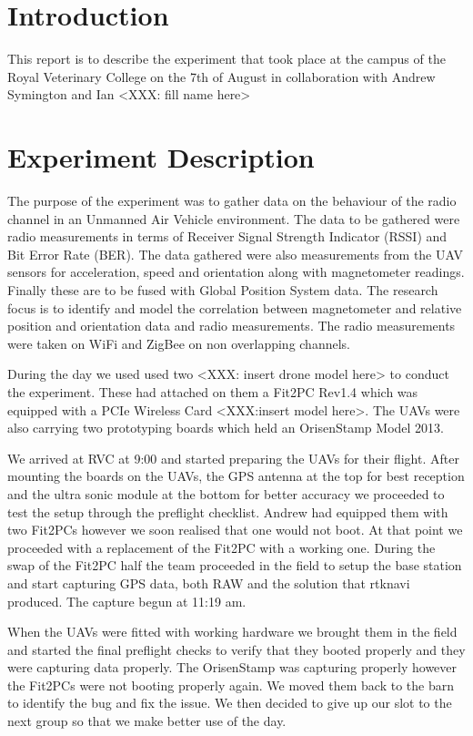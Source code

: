 





\section{Introduction}

This report is to describe the experiment that took place at the campus of the
Royal Veterinary College on the 7th of August in collaboration with Andrew
Symington and Ian <XXX: fill name here>


\section{Experiment Description}
The purpose of the experiment was to gather data on the behaviour of the radio
channel in an Unmanned Air Vehicle environment. The data to be gathered were
radio measurements in terms of Receiver Signal Strength Indicator (RSSI) and Bit
Error Rate (BER). The data gathered were also measurements from the UAV sensors
for acceleration, speed and orientation along with magnetometer readings.
Finally these are to be fused with Global Position System data. The research
focus is to identify and model the correlation between magnetometer and relative
position and orientation data and radio measurements. The radio measurements
were taken on WiFi and ZigBee on non overlapping channels.


During the day we used used two <XXX: insert drone model here> to conduct the
experiment. These had attached on them a Fit2PC Rev1.4 which was equipped with a
PCIe Wireless Card <XXX:insert model here>. The UAVs were also carrying two
prototyping boards which held an OrisenStamp Model 2013.

We arrived at RVC at 9:00 and started preparing the UAVs for their flight.
After mounting the boards on the UAVs, the GPS antenna at the top for best
reception and the ultra sonic module at the bottom for better accuracy we
proceeded to test the setup through the preflight checklist. Andrew had equipped
them with two Fit2PCs however we soon realised that one would not boot. At that
point we proceeded with a replacement of the Fit2PC with a working one. During
the swap of the Fit2PC half the team proceeded in the field to setup the base
station and start capturing GPS data, both RAW and the solution that rtknavi
produced. The capture begun at 11:19 am.

When the UAVs were fitted with working hardware we brought them in the field and
started the final preflight checks to verify that they booted properly and they
were capturing data properly. The OrisenStamp was capturing properly however the
Fit2PCs were not booting properly again. We moved them back to the barn to
identify the bug and fix the issue. We then decided to give up our slot to the
next group so that we make better use of the day.

